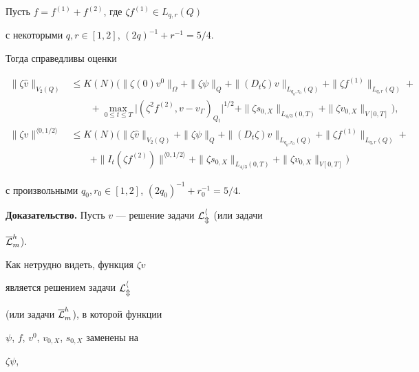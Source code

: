 \begin{props} 


Пусть $f=f^{(1)}+f^{(2)}$, где $\zeta f^{(1)}\in L_{q,r}(Q)$


с некоторыми $q,r\in [1,2]$, $(2q)^{-1}+r^{-1}=5/4$.


Тогда справедливы оценки


\begin{align*}


\|\zeta \widehat {v}\|_{V_2(Q)}&\le K(N)


\big(\|\zeta(0) v^0\|_\Omega +


\|\zeta\psi\|_Q +\|(D_t\zeta)v\|_{L_{q_0,r_0}(Q)}+


\|\zeta f^{(1)}\|_{L_{q,r}(Q)}+\\


&\qquad+\max_{0\le t\le T}\big|(\zeta^2f^{(2)},v-v_{\Gamma})_{Q_t}\big|^{1/2}


+\|\zeta s_{0,X}\|_{L_{4/3}(0,T)}+\|\zeta v_{0,X}\|_{V[0,T]}\big),\\


\|\zeta v\|^{\langle 0,1/2\rangle}&\le K(N)


\big(\|\zeta \widehat{v}\|_{V_2(Q)}+


\|\zeta \psi\|_Q +\|(D_t\zeta)v\|_{L_{q_0,r_0}(Q)}+


\|\zeta f^{(1)}\|_{L_{q,r}(Q)}+\\


&\qquad+\|I_t(\zeta f^{(2)})\|^{\langle 0,1/2\rangle}


+\|\zeta s_{0,X}\|_{L_{4/3}(0,T)}+\|\zeta v_{0,X}\|_{V[0,T]}\big)


\end{align*}


с произвольными $q_0,r_0\in [1,2]$, $(2q_0)^{-1}+r_0^{-1}=5/4$.


\end{props}





{\bf Доказательство.} Пусть $v$ --- решение задачи $\cal L_m^h$ (или задачи


$\overline{\cal L}_m^h$).


Как нетрудно видеть, функция $\zeta v$


является решением задачи $\cal L_m^h$


(или задачи $\overline{\cal L}_m^h$), в которой функции


$\psi$, $f$, $v^0$, $v_{0,X}$, $s_{0,X}$ заменены на


$\zeta\psi$,


